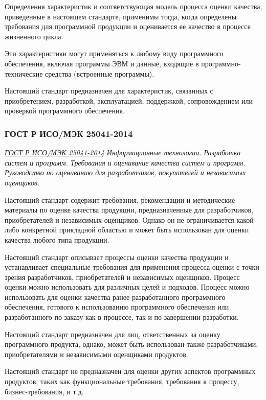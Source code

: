 Определения характеристик и соответствующая модель процесса оценки качества,
приведенные в настоящем стандарте, применимы тогда,
когда определены требования для программной продукции
и оценивается ее качество в процессе жизненного цикла.

Эти характеристики могут применяться к любому виду программного обеспечения,
включая программы ЭВМ и данные,
входящие в программно-технические средства (встроенные программы).

Настоящий стандарт предназначен для характеристик,
связанных с приобретением, разработкой, эксплуатацией, поддержкой,
сопровождением или проверкой программного обеспечения.

\subsubsection{ГОСТ Р ИСО/МЭК 25041-2014}

\emph{\href{https://docs.cntd.ru/document/1200111122}
{ГОСТ Р ИСО/МЭК 25041-2014}
Информационные технологии.
Разработка систем и программ.
Требования и оценивание качества систем и программ.
Руководство по оцениванию для разработчиков, покупателей и независимых оценщиков.
}

Настоящий стандарт содержит требования,
рекомендации и методические материалы по оценке качества продукции,
предназначенные для разработчиков, приобретателей и независимых оценщиков.
Однако он не ограничивается какой-либо конкретной прикладной областью
и может быть использован для оценки качества любого типа продукции.

Настоящий стандарт описывает процессы оценки качества продукции
и устанавливает специальные требования
для применения процесса оценки с точки зрения разработчиков,
приобретателей и независимых оценщиков.
Процесс оценки можно использовать для различных целей и подходов.
Процесс можно использовать
для оценки качества ранее разработанного программного обеспечения,
готового к использованию программного обеспечения
или разработанного по заказу как в процессе, так и по завершении разработки.

Настоящий стандарт предназначен для лиц,
ответственных за оценку программного продукта, однако,
может быть использован также разработчиками,
приобретателями и независимыми оценщиками продуктов.

Настоящий стандарт не предназначен
для оценки других аспектов программных продуктов,
таких как функциональные требования,
требования к процессу, бизнес-требования, и т.д.

